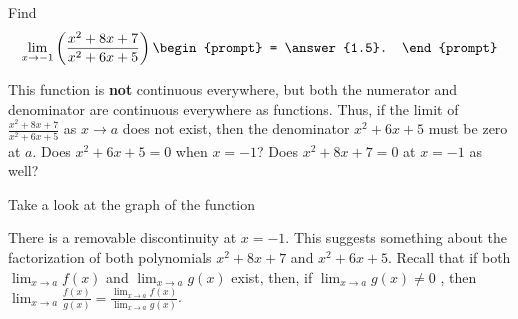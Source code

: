 \documentclass{ximera}
\author{Gregory Hartman \and Matthew Carr}
\begin{document}
\begin{exercise}



  Find 
  \[
  \lim_{x\to-1}\left({\frac{x^2+8x+7}{x^2+6x+5}}\right)
  \begin{prompt}
  = \answer{1.5}.
  \end{prompt}
  \]
    \begin{hint}
      This function is \textbf{not} continuous everywhere, but both the numerator and denominator are continuous everywhere as functions. Thus, if the limit of $\frac{x^2+8x+7}{x^2+6x+5}$ as $x\to{a}$ does not exist, then the denominator $x^2+6x+5$ must be zero at $a$. Does $x^2+6x+5=0$ when $x=-1$? Does $x^2+8x+7=0$ at $x=-1$ as well?
    \end{hint}
     \begin{hint}
    Take a look at the graph of the function
    \begin{center}
      \end{center}
      There is a removable discontinuity at $x=-1$. This suggests something about the factorization of both polynomials $x^2+8x+7$ and $x^2+6x+5$. Recall that if both $\lim_{x\to a}f(x)$ and $\lim_{x\to a}g(x)$ exist, then, if  $\lim_{x\to a}g(x)\ne0$ , then $\lim_{x\to a}\frac{f(x)}{g(x)}=\frac{\lim_{x\to a}f(x)}{\lim_{x\to a}g(x)}$.
    \end{hint}
    \begin{hint}

\end{hint}
\end{exercise}
\end{document}
